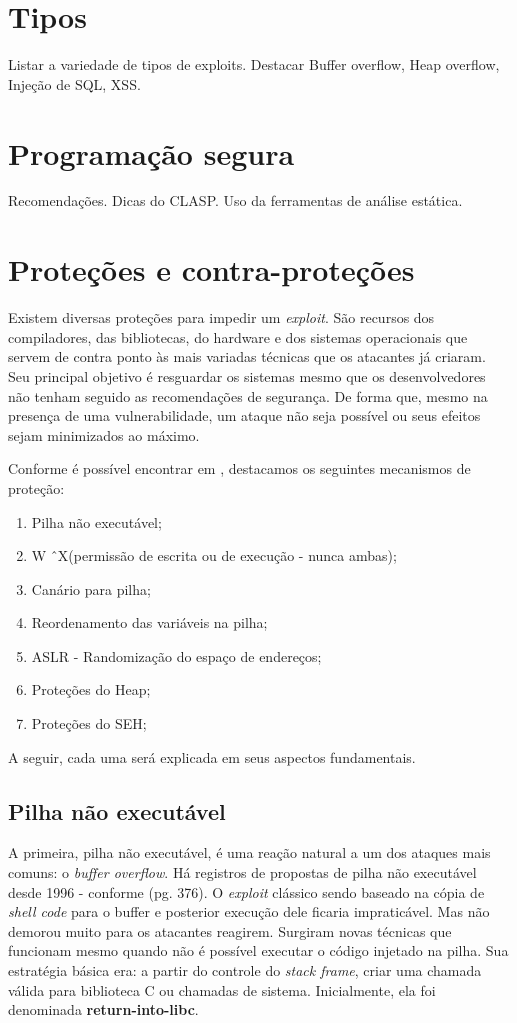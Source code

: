 	\section{Tipos}
		
		Listar a variedade de tipos de exploits.
		Destacar Buffer overflow, Heap overflow, Injeção de SQL, XSS.

	\section{Programação segura}
		Recomendações. Dicas do CLASP.
		Uso da ferramentas de análise estática.
	
	\section{Proteções e contra-proteções}
	\label{sec:exploit_protection}
		Existem diversas proteções para impedir um \textsl{exploit}.
		São recursos dos compiladores, das bibliotecas, do hardware e dos sistemas operacionais
		que servem de contra ponto às mais variadas técnicas que os atacantes já criaram.
		Seu principal objetivo é resguardar os sistemas mesmo que os desenvolvedores
		não tenham seguido as recomendações de segurança. De forma que, mesmo na presença de uma
		vulnerabilidade, um ataque não seja possível ou seus efeitos sejam minimizados ao máximo.
		
		
		Conforme é possível encontrar em \cite{Anley2007}, destacamos os seguintes mecanismos
		de proteção:
		\begin{enumerate}
			\item{Pilha não executável;}
			\item{W \^\ X(permissão de escrita ou de execução - nunca ambas);}
			\item{Canário para pilha;}
			\item{Reordenamento das variáveis na pilha;}
			\item{ASLR - Randomização do espaço de endereços;}
			\item{Proteções do Heap;}
			\item{Proteções do SEH;}
		\end{enumerate}

		
		A seguir, cada uma será explicada em seus aspectos fundamentais.
		\subsection{Pilha não executável}
			A primeira, pilha não executável, é uma reação natural a um dos ataques mais comuns:
			o \textsl{buffer overflow}. Há registros de propostas de pilha não executável desde 1996 -
			conforme \cite{Anley2007}(pg. 376). O \textsl{exploit} clássico sendo baseado na cópia
			de \textsl{shell code} para o buffer e posterior execução dele ficaria impraticável.
			Mas não demorou muito para os atacantes reagirem. Surgiram novas técnicas que funcionam
			mesmo quando não é possível executar o código injetado na pilha.
			Sua estratégia básica era: a partir do controle do \textsl{stack frame}, criar uma chamada
			válida para biblioteca C ou chamadas de sistema. Inicialmente, ela foi denominada \textbf{return-into-libc}.
			
